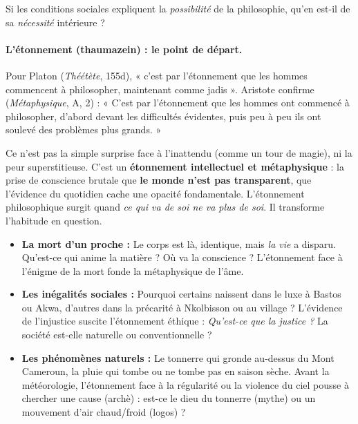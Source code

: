 \documentclass[11pt]{article}
\newcommand{\cle}[1]{{\popxbold\color{popdark}#1}}
\begin{document}
Si les conditions sociales expliquent la \emph{possibilité} de la philosophie, qu'en est-il de sa \emph{nécessité} intérieure ?

\paragraph{L'étonnement (\cle{thaumazein}) : le point de départ.}
Pour \cle{Platon} (\emph{Théétète}, 155d), « c'est par l'étonnement que les hommes commencent à philosopher, maintenant comme jadis ». \cle{Aristote} confirme (\emph{Métaphysique}, A, 2) : « C'est par l'étonnement que les hommes ont commencé à philosopher, d'abord devant les difficultés évidentes, puis peu à peu ils ont soulevé des problèmes plus grands. »

\begin{definition}
Ce n'est pas la simple surprise face à l'inattendu (comme un tour de magie), ni la peur superstitieuse. C'est un \textbf{étonnement intellectuel et métaphysique} : la prise de conscience brutale que \textbf{le monde n'est pas transparent}, que l'évidence du quotidien cache une opacité fondamentale. L'étonnement philosophique surgit quand \emph{ce qui va de soi ne va plus de soi}. Il transforme l'habitude en question.
\end{definition}

\begin{exemplebox}
\begin{itemize}
    \item \textbf{La mort d'un proche :} Le corps est là, identique, mais \emph{la vie} a disparu. Qu'est-ce qui anime la matière ? Où va la conscience ? L'étonnement face à l'énigme de la mort fonde la métaphysique de l'âme.
    \item \textbf{Les inégalités sociales :} Pourquoi certains naissent dans le luxe à Bastos ou Akwa, d'autres dans la précarité à Nkolbisson ou au village ? L'évidence de l'injustice suscite l'étonnement éthique : \emph{Qu'est-ce que la justice ?} La société est-elle naturelle ou conventionnelle ?
    \item \textbf{Les phénomènes naturels :} Le tonnerre qui gronde au-dessus du Mont Cameroun, la pluie qui tombe ou ne tombe pas en saison sèche. Avant la météorologie, l'étonnement face à la régularité ou la violence du ciel pousse à chercher une \cle{cause} (archè) : est-ce le dieu du tonnerre (mythe) ou un mouvement d'air chaud/froid (logos) ?
\end{itemize}
\end{exemplebox}
\end{document}
